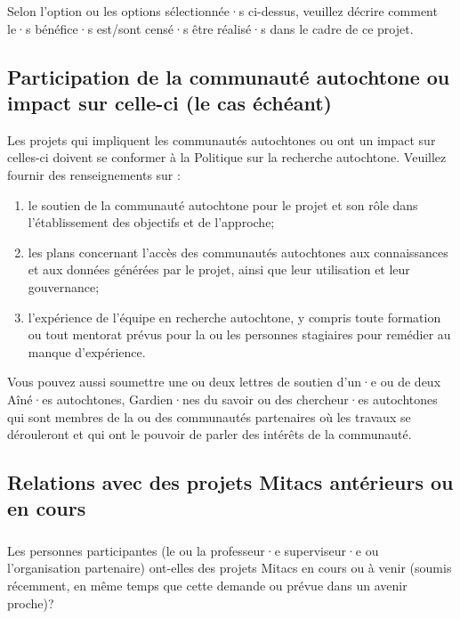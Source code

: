 \documentclass{mitacs-acceleration}
\begin{document}
\begin{instructions}
Selon l'option ou les options sélectionnée·s ci-dessus, veuillez décrire comment le·s bénéfice·s est/sont censé·s être réalisé·s dans le cadre de ce projet.
\end{instructions}


\subsection{Participation de la communauté autochtone ou impact sur celle-ci (le cas échéant)} %

\begin{instructions}
Les projets qui impliquent les communautés autochtones ou ont un impact sur celles-ci doivent se conformer à la Politique sur la recherche autochtone. 
Veuillez fournir des renseignements sur :

\begin{enumerate}[label=\alph*)]
\item le soutien de la communauté autochtone pour le projet et son rôle dans l'établissement des objectifs et de l'approche;
\item les plans concernant l'accès des communautés autochtones aux connaissances et aux données générées par le projet, ainsi que leur utilisation et leur gouvernance;
\item l'expérience de l'équipe en recherche autochtone, y compris toute formation ou tout mentorat prévus pour la ou les personnes stagiaires pour remédier au manque d'expérience.
\end{enumerate}

Vous pouvez aussi soumettre une ou deux lettres de soutien d'un·e ou de deux Aîné·es autochtones, Gardien·nes du savoir ou des chercheur·es autochtones qui sont membres de la ou des communautés partenaires où les travaux se dérouleront et qui ont le pouvoir de parler des intérêts de la communauté.
\end{instructions}


\subsection{Relations avec des projets Mitacs antérieurs ou en cours} %

\subsubsection{} Les personnes participantes (le ou la professeur·e superviseur·e ou l'organisation partenaire) ont-elles des projets Mitacs en cours ou à venir (soumis récemment, en même temps que cette demande ou prévue dans un avenir proche)?
\end{document}
